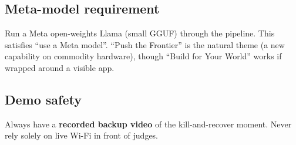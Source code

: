 \subsection{Meta-model requirement}
Run a Meta open-weights Llama (small GGUF) through the pipeline. This satisfies
``use a Meta model''. ``Push the Frontier'' is the natural theme (a new
capability on commodity hardware), though ``Build for Your World'' works if
wrapped around a visible app.

\subsection{Demo safety}
Always have a \textbf{recorded backup video} of the kill-and-recover moment.
Never rely solely on live Wi-Fi in front of judges.
